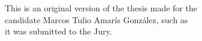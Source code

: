 \documentclass[openany,11pt,twoside,a4paper]{book}
\begin{document}
    \vskip 2cm

    \begin{flushright}
	This is an original version of the thesis made for the\\
	candidate Marcos Tulio Amarís González, such as \\
	it was submitted to the Jury.
    \end{flushright}

\pagebreak


%
%
%
%
% 
% 
% 
% 
% 
%     
\end{document}
